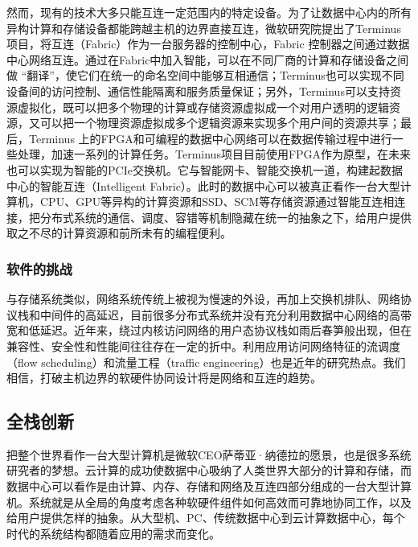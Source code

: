 然而，现有的技术大多只能互连一定范围内的特定设备。为了让数据中心内的所有异构计算和存储设备都能跨越主机的边界直接互连，微软研究院提出了Terminus项目，将互连（Fabric）作为一台服务器的控制中心，Fabric 控制器之间通过数据中心网络互连。通过在Fabric中加入智能，可以在不同厂商的计算和存储设备之间做 “翻译”，使它们在统一的命名空间中能够互相通信；Terminus也可以实现不同设备间的访问控制、通信性能隔离和服务质量保证；另外，Terminus可以支持资源虚拟化，既可以把多个物理的计算或存储资源虚拟成一个对用户透明的逻辑资源，又可以把一个物理资源虚拟成多个逻辑资源来实现多个用户间的资源共享；最后，Terminus 上的FPGA和可编程的数据中心网络可以在数据传输过程中进行一些处理，加速一系列的计算任务。Terminus项目目前使用FPGA作为原型，在未来也可以实现为智能的PCIe交换机。它与智能网卡、智能交换机一道，构建起数据中心的智能互连（Intelligent Fabric）。此时的数据中心可以被真正看作一台大型计算机，CPU、GPU等异构的计算资源和SSD、SCM等存储资源通过智能互连相连接，把分布式系统的通信、调度、容错等机制隐藏在统一的抽象之下，给用户提供取之不尽的计算资源和前所未有的编程便利。


\subsubsection{软件的挑战}

与存储系统类似，网络系统传统上被视为慢速的外设，再加上交换机排队、网络协议栈和中间件的高延迟，目前很多分布式系统并没有充分利用数据中心网络的高带宽和低延迟。近年来，绕过内核访问网络的用户态协议栈如雨后春笋般出现，但在兼容性、安全性和性能间往往存在一定的折中。利用应用访问网络特征的流调度（flow scheduling）和流量工程（traffic engineering）也是近年的研究热点。我们相信，打破主机边界的软硬件协同设计将是网络和互连的趋势。

\subsection{全栈创新}

把整个世界看作一台大型计算机是微软CEO萨蒂亚·纳德拉的愿景，也是很多系统研究者的梦想。云计算的成功使数据中心吸纳了人类世界大部分的计算和存储，而数据中心可以看作是由计算、内存、存储和网络及互连四部分组成的一台大型计算机。系统就是从全局的角度考虑各种软硬件组件如何高效而可靠地协同工作，以及给用户提供怎样的抽象。从大型机、PC、传统数据中心到云计算数据中心，每个时代的系统结构都随着应用的需求而变化。


